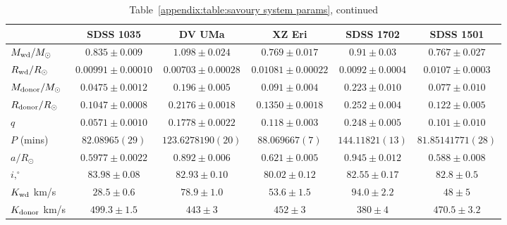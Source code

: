\begin{landscape}
        \begin{table}
            \caption{Table~\ref{appendix:table:savoury system params}, continued}
            \label{appendix:table:savoury system params cont 1}
            \begin{tabular}{lccccc}
                \hline
                ~                           & {\bf SDSS 1035}       & {\bf DV UMa}          & {\bf XZ Eri}          & {\bf SDSS 1702}       & {\bf SDSS 1501}       \\
                \hline
                \hline
                $M_{\rm wd}/M_{\odot}$      & $0.835\pm0.009$       & $1.098\pm0.024$       & $0.769\pm0.017$       & $0.91\pm0.03$         & $0.767\pm0.027$       \\
                $R_{\rm wd}/R_{\odot}$      & $0.00991\pm0.00010$   & $0.00703\pm0.00028$   & $0.01081\pm0.00022$   & $0.0092\pm0.0004$     & $0.0107\pm0.0003$     \\
                $M_{\rm donor}/M_{\odot}$   & $0.0475\pm0.0012$     & $0.196\pm0.005$       & $0.091\pm0.004$       & $0.223\pm0.010$       & $0.077\pm0.010$       \\
                $R_{\rm donor}/R_{\odot}$   & $0.1047\pm0.0008$     & $0.2176\pm0.0018$     & $0.1350\pm0.0018$     & $0.252\pm0.004$       & $0.122\pm0.005$       \\
                $q$                         & $0.0571\pm0.0010$     & $0.1778\pm0.0022$     & $0.118\pm0.003$       & $0.248\pm0.005$       & $0.101\pm0.010$       \\
                \hline
                $P$ (mins)                  & $82.08965(29)$        & $123.6278190(20)$     & $88.069667(7)$        & $144.11821(13)$       & $81.85141771(28)$     \\
                $a/R_{\odot}$               & $0.5977\pm0.0022$     & $0.892\pm0.006$       & $0.621\pm0.005$       & $0.945\pm0.012$       & $0.588\pm0.008$       \\
                $i, ^\circ$                 & $83.98\pm0.08$        & $82.93\pm0.10$        & $80.02\pm0.12$        & $82.55\pm0.17$        & $82.8\pm0.5$          \\
                $K_{\rm wd}$ km/s           & $28.5\pm0.6$          & $78.9\pm1.0$          & $53.6\pm1.5$          & $94.0\pm2.2$          & $48\pm5$              \\
                $K_{\rm donor}$ km/s        & $499.3\pm1.5$         & $443\pm3$             & $452\pm3$             & $380\pm4$             & $470.5\pm3.2$         \\

\end{tabular}
\end{table}
\end{landscape}
